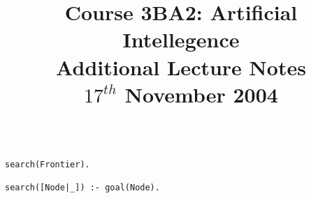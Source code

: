 \documentclass[a4paper,12pt]{article}
\begin{document}
\title{Course 3BA2: Artificial Intellegence \\ Additional Lecture Notes \\ $17^{th}$ November 2004}

\maketitle


\begin{verbatim}

search(Frontier).

search([Node|_]) :- goal(Node).

\end{verbatim}

\end{document}
